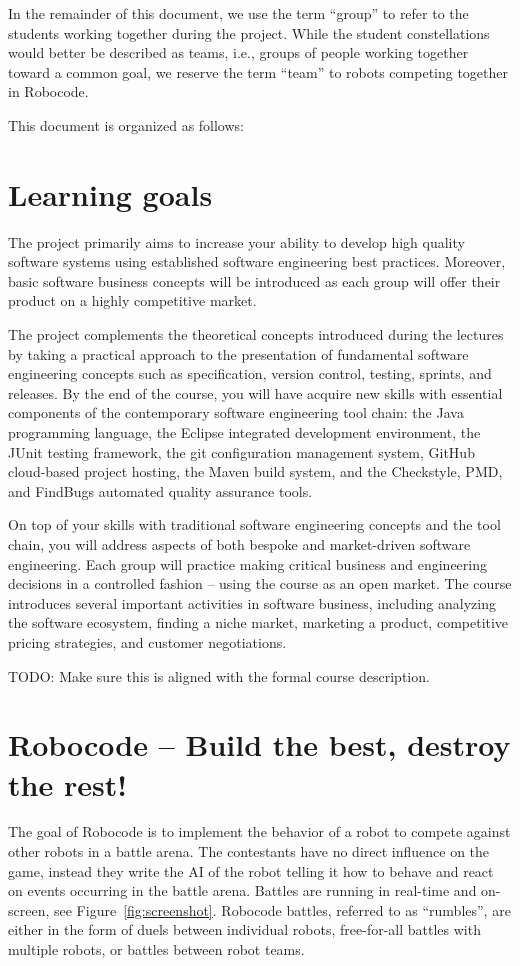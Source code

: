 \documentclass{scrreprt}
\begin{document}
In the remainder of this document, we use the term ``group'' to refer to the students working together during the project. While the student constellations would better be described as teams, i.e., groups of people working together toward a common goal, we reserve the term ``team'' to robots competing together in Robocode.

This document is organized as follows: 

\section{Learning goals}
The project primarily aims to increase your ability to develop high quality software systems using established software engineering best practices. Moreover, basic software business concepts will be introduced  as each group will offer their product on a highly competitive market.

The project complements the theoretical concepts introduced during the lectures by taking a practical approach to the presentation of fundamental software engineering concepts such as specification, version control, testing, sprints, and releases. By the end of the course, you will have acquire new skills with essential components of the contemporary  software engineering tool chain: the Java programming language, the Eclipse integrated development environment, the JUnit testing framework, the git configuration management system, GitHub cloud-based project hosting, the Maven build system, and the Checkstyle, PMD, and FindBugs automated quality assurance tools.

On top of your skills with traditional software engineering concepts and the tool chain, you will address aspects of both bespoke and market-driven software engineering. Each group will practice making critical business and engineering decisions in a controlled fashion -- using the course as an open market. The course introduces several important activities in software business, including analyzing the software ecosystem, finding a niche market, marketing a product, competitive pricing strategies, and customer negotiations.

TODO: Make sure this is aligned with the formal course description.

\section{Robocode -- Build the best, destroy the rest!}
The goal of Robocode is to implement the behavior of a robot to compete against other robots in a battle arena. The contestants have no direct influence on the game, instead they write the AI of the robot telling it how to behave and react on events occurring in the battle arena. Battles are running in real-time and on-screen, see Figure~\ref{fig:screenshot}. Robocode battles, referred to as ``rumbles'', are either in the form of duels between individual robots, free-for-all battles with multiple robots, or battles between robot teams.
\end{document}
